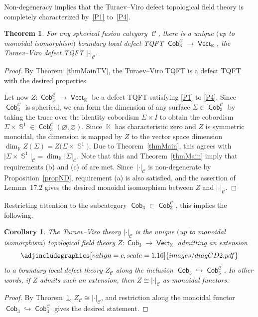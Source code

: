 \documentclass[10pt,a4paper]{amsart}
\DeclareMathOperator{\vect}{\mathsf{Vect}}
\DeclareMathOperator{\K}{\mathbb{K}}
\DeclareMathOperator{\Sp}{\mathbb{S}}
\DeclareMathOperator{\Cob}{\mathsf{Cob}}
\DeclareMathOperator{\calc}{\mathcal{C}}
\numberwithin{equation}{section}
\newtheorem{Theorem}{Theorem}[section]
\newtheorem{Corollary}[Corollary]{Corollary}
\theoremstyle{definition}
\begin{document}
Non-degeneracy implies that the Turaev--Viro defect topological field theory is completely characterized by~\ref{P1} to~\ref{P4}.
\begin{Theorem}\label{thmComb}
For any spherical fusion category $\calc$, there is a unique $($up to monoidal iso\-mor\-phism$)$ boundary local defect TQFT $\Cob_3^{\calc} \rightarrow \vect_{\K}$, the Turaev--Viro defect TQFT $|\cdot|_{\calc}$.
\end{Theorem}
\begin{proof}By Theorem~\ref{thmMainTV}, the Turaev--Viro TQFT is a defect TQFT with the desired properties.

Let now $Z\colon \Cob_3^{\calc} \rightarrow \vect_{\K}$ be a defect TQFT satisfying \ref{P1} to \ref{P4}. Since $\Cob_3^{\calc}$ is spherical, we can form the dimension of any surface $\Sigma \in \Cob_3^{\calc}$ by taking the trace over the identity cobordism $\Sigma \times I$ to obtain the cobordism $\Sigma \times \Sp^1 \in \Cob_3^{\calc}(\varnothing, \varnothing)$. Since $\K$ has characteristic zero and $Z$ is symmetric monoidal, the dimension is mapped by $Z$ to the vector space dimension $\dim_{\K}Z(\Sigma) = Z\bigl(\Sigma \times \Sp^1\bigr)$. Due to Theorem~\ref{thmMain}, this agrees with $\bigl|\Sigma \times \Sp^1\bigr|_{\calc} = \dim_{\K}|\Sigma|_{\calc}$. Note that this and Theorem~\ref{thmMain} imply that requirements (b) and (c) of \cite[Lemma~17.2]{TV} are met. Since~$| \cdot |_{\calc}$ is non-degenerate by Proposition~\ref{propND}, requirement (a) is also satisfied, and the assertion of Lemma~17.2 gives the desired monoidal isomorphism between $Z$ and $| \cdot |_{\calc}$.
\end{proof}

Restricting attention to the subcategory $\Cob_3 \subset \Cob_3^{\calc}$, this implies the following.
\begin{Corollary}
 \label{corThmMain2}
 The Turaev--Viro theory $|\cdot|_{\calc}$ is the unique $($up to monoidal isomorphism$)$ topological field theory $Z\colon \Cob_3 \rightarrow \vect_{\K}$ admitting an extension
 \[
 \centering
 \adjincludegraphics[valign=c, scale = 1.16]{images/diagCD2.pdf}
 \]
 to a boundary local defect theory $Z_{\calc}$ along the inclusion $\Cob_3 \hookrightarrow \Cob_3^{\calc}$. In other words, if $Z$ admits such an extension, then $Z \cong |\cdot|_{\calc}$ as monoidal functors.
\end{Corollary}
\begin{proof}
By Theorem~\ref{thmComb}, $Z_{\calc} \cong | \cdot |_{\calc}$, and restriction along the monoidal functor $\Cob_3 \hookrightarrow \Cob_3^{\calc}$ gives the desired statement.
\end{proof}
\end{document}
